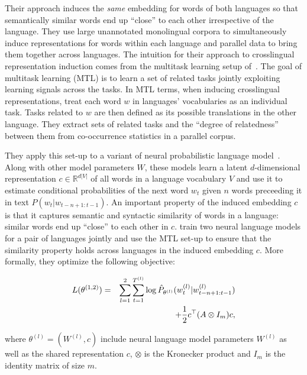 \documentclass[11pt,letterpaper]{article}
\begin{document}
Their approach induces the \emph{same} embedding for words of both languages so that semantically similar words end up ``close'' to each other irrespective of the language.  They use large unannotated monolingual corpora to simultaneously induce representations for words within each language and parallel data to bring them together across languages.  The intuition for their approach to crosslingual representation induction comes from the multitask learning setup of~.  The goal of multitask learning (MTL) is to learn a set of related tasks jointly exploiting learning signals across the tasks.  In MTL terms, when inducing crosslingual representations,  treat each word $w$ in languages'  vocabularies as an individual task.  Tasks related to $w$ are then defined as its possible translations in the other language.  They extract sets of related tasks and the ``degree of relatedness'' between them from co-occurrence statistics in a parallel corpus.

They apply this set-up to a variant of neural probabilistic language model~\cite{Bengio:2003}.  Along with other model parameters $W$, these models learn a latent $d$-dimensional representation $c \in \mathbb{R}^{d|V|}$ of all words in a language vocabulary $V$ and use it to estimate conditional probabilities of the next word $w_t$ given $n$ words preceeding it in text $\hat{P}(w_t | w_{t-n+1:t-1})$.  An important property of the induced embedding $c$ is that it captures semantic and syntactic similarity of words in a language: similar words end up ``close'' to each other in $c$.   train two neural language models for a pair of languages jointly and use the MTL set-up to ensure that the similarity property holds across languages in the induced embedding $c$.  More formally, they optimize the following objective:

\begin{eqnarray}
 L(\theta^{(1,2)}) & = & \sum_{l=1}^{2} {\sum_{t = 1}^{T^{(l)}} \log \hat{P}_{\theta^{(l)}}(w^{(l)}_t | w^{(l)}_{t-n+1:t-1})} \nonumber \\
 &&+ {1  \over 2} c^{\top} (A \otimes I_m) c, \nonumber
 \end{eqnarray}

where $\theta^{(l)} = (W^{(l)}, c)$ include neural language model parameters $W^{(l)}$ as well as the shared  representation $c$, $\otimes$ is the Kronecker product and $I_m$ is the identity 
matrix of size $m$.  
\end{document}
